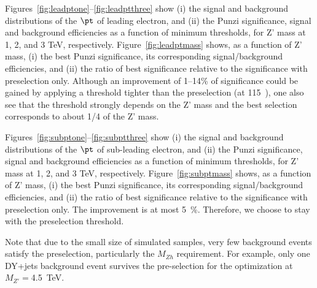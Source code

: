 Figures~\ref{fig:leadptone}--\ref{fig:leadptthree} show (i) the signal and 
background distributions of the $\pt$ of leading electron, and (ii) the Punzi 
significance, signal and background efficiencies as a function of minimum \pt 
thresholds, for Z' mass at 1, 2, and 3 TeV, respectively. 
Figure~\ref{fig:leadptmass} shows, as a function of Z' mass, (i) the best 
Punzi significance, its corresponding signal/background efficiencies, and 
(ii) the ratio of best significance relative to the significance with 
preselection only. 
Although an improvement of 1--14\% of significance 
could be gained by applying a \pt threshold tighter than the preselection 
(at 115~\GeV), one also see that the threshold strongly depends on the Z' 
mass and the best selection corresponds to about 1/4 of the Z' mass. 

Figures~\ref{fig:subptone}--\ref{fig:subptthree} show (i) the signal and 
background distributions of the $\pt$ of sub-leading electron, and (ii) the 
Punzi significance, signal and background efficiencies as a function of 
minimum \pt thresholds, for Z' mass at 1, 2, and 3 TeV, respectively. 
Figure~\ref{fig:subptmass} shows, as a function of Z' mass, (i) the best Punzi 
significance, its corresponding signal/background efficiencies, and (ii) the 
ratio of best significance relative to the significance with preselection 
only. 
The improvement is at most 5~\%. Therefore, we choose to stay with the 
preselection \pt threshold. 

Note that due to the small size of simulated samples, very few background 
events satisfy the preselection, particularly the $M_{Zh}$ requirement. 
For example, only one DY+jets 
background event survives the pre-selection for the optimization at 
$M_{Z'}=$4.5~TeV. 



